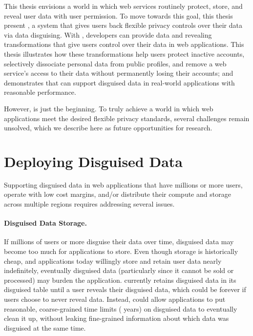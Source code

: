 This thesis envisions a world in which web services routinely
protect, store, and reveal \xxed user data with user permission.
%
To move towards this goal, this thesis present \sys, a system that gives users back
flexible privacy controls over their data via data disguising.
%
With \sys, developers can provide data \xxing and revealing transformations that
give users control over their data in web applications.
%
This thesis illustrates how these transformations help users protect
inactive accounts, selectively dissociate personal data from public profiles,
and remove a web service's access to their data without permanently losing their
accounts;
%
and demonstrates that \sys can support disguised data in real-world applications with
reasonable performance.
%

%
However, \sys is just the beginning. To truly achieve a world in which web
applications meet the desired flexible privacy standards, several
challenges remain unsolved, which we describe here as future
opportunities for research.
%

\section{Deploying Disguised Data}

Supporting disguised data in web applications that have millions or more users,
operate with low cost margins, and/or distribute their compute and storage
across multiple regions requires addressing several issues.

%
\paragraph{Disguised Data Storage.} If millions of users or more disguise
their data over time, disguised data may become too much for applications to
store.
%
Even though storage is historically cheap, and applications today willingly
store and retain user data nearly indefinitely, eventually disguised data
(particularly since it cannot be sold or processed) may burden the application.
%
\sys currently retains disguised data in its disguised table until a user
reveals their disguised data, which could be forever if users choose to never
reveal data.
%
Instead, \sys could allow applications to put reasonable, coarse-grained time
limits ( years) on disguised data to eventually clean it up, without
leaking fine-grained information about which data was disguised at the same
time.
%

